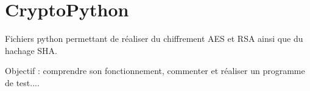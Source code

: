 \chapter{Crypto\+Python}
\hypertarget{md_README}{}\label{md_README}
\label{md_README_autotoc_md0}%
%
 Fichiers python permettant de réaliser du chiffrement AES et RSA ainsi que du hachage SHA.

Objectif \+: comprendre son fonctionnement, commenter et réaliser un programme de test.... 